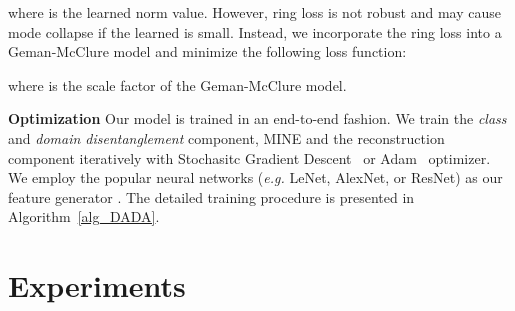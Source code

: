 \documentclass{article}
\begin{document}
where  is the learned norm value. However, ring loss is not robust and may cause mode collapse if the learned  is small. Instead, we incorporate the ring loss into a Geman-McClure model and minimize the following loss function:

where  is the scale factor of the Geman-McClure model. 

\textbf{Optimization} Our model is trained in an end-to-end fashion. We train the \textit{class} and \textit{domain disentanglement} component, MINE and the reconstruction component iteratively with Stochasitc Gradient Descent~\cite{SGD} or Adam~\cite{Adam} optimizer. We employ the popular neural networks (\textit{e.g.} LeNet, AlexNet, or ResNet) as our feature generator . The detailed training procedure is presented in Algorithm~\ref{alg_DADA}.


 \section{Experiments}

\newcommand{\RomanNumeralCaps}[1]
    {\MakeUppercase{\romannumeral #1}}
\end{document}
